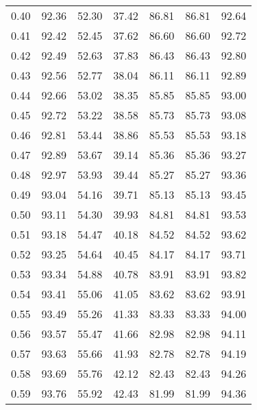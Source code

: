 \begin{tabular}{|c|c|c|c|c|c|c|}
      0.40 &     92.36 &     52.30 &      37.42 &   86.81 &      86.81 &         92.64 \\
      0.41 &     92.42 &     52.45 &      37.62 &   86.60 &      86.60 &         92.72 \\
      0.42 &     92.49 &     52.63 &      37.83 &   86.43 &      86.43 &         92.80 \\
      0.43 &     92.56 &     52.77 &      38.04 &   86.11 &      86.11 &         92.89 \\
      0.44 &     92.66 &     53.02 &      38.35 &   85.85 &      85.85 &         93.00 \\
      0.45 &     92.72 &     53.22 &      38.58 &   85.73 &      85.73 &         93.08 \\
      0.46 &     92.81 &     53.44 &      38.86 &   85.53 &      85.53 &         93.18 \\
      0.47 &     92.89 &     53.67 &      39.14 &   85.36 &      85.36 &         93.27 \\
      0.48 &     92.97 &     53.93 &      39.44 &   85.27 &      85.27 &         93.36 \\
      0.49 &     93.04 &     54.16 &      39.71 &   85.13 &      85.13 &         93.45 \\
      0.50 &     93.11 &     54.30 &      39.93 &   84.81 &      84.81 &         93.53 \\
      0.51 &     93.18 &     54.47 &      40.18 &   84.52 &      84.52 &         93.62 \\
      0.52 &     93.25 &     54.64 &      40.45 &   84.17 &      84.17 &         93.71 \\
      0.53 &     93.34 &     54.88 &      40.78 &   83.91 &      83.91 &         93.82 \\
      0.54 &     93.41 &     55.06 &      41.05 &   83.62 &      83.62 &         93.91 \\
      0.55 &     93.49 &     55.26 &      41.33 &   83.33 &      83.33 &         94.00 \\
      0.56 &     93.57 &     55.47 &      41.66 &   82.98 &      82.98 &         94.11 \\
      0.57 &     93.63 &     55.66 &      41.93 &   82.78 &      82.78 &         94.19 \\
      0.58 &     93.69 &     55.76 &      42.12 &   82.43 &      82.43 &         94.26 \\
      0.59 &     93.76 &     55.92 &      42.43 &   81.99 &      81.99 &         94.36 \\

\end{tabular}
